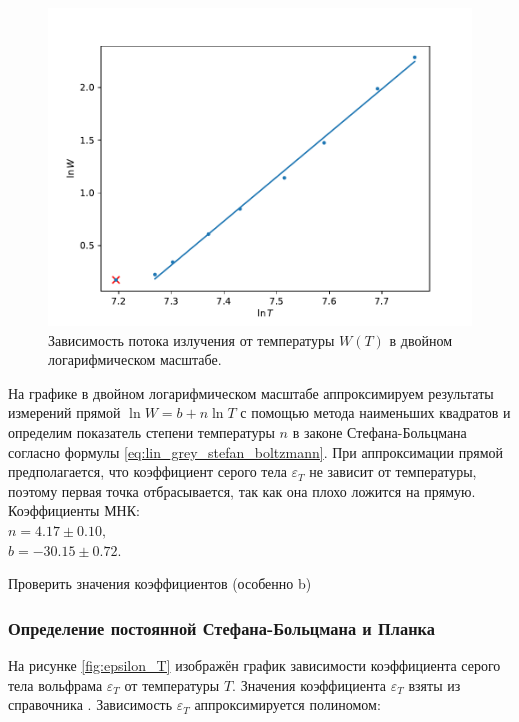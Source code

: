 \documentclass[10pt,a4paper]{article}
\begin{document}
\begin{multicols}{2}
	\begin{figure}[H]
		\includegraphics[width=1\textwidth]{gen/fig-linwt.pdf}
		\caption{Зависимость потока излучения от температуры $W(T)$ в двойном логарифмическом масштабе.}
		\label{fig:lnw_lnt}
	\end{figure}
	
	На графике в двойном логарифмическом масштабе аппроксимируем результаты измерений прямой $\ln W = b + n \ln T$ с помощью метода наименьших квадратов и определим показатель степени температуры $n$ в законе Стефана-Больцмана согласно формулы \ref{eq:lin_grey_stefan_boltzmann}. При аппроксимации прямой предполагается, что коэффициент серого тела $\varepsilon_T$ не зависит от температуры, поэтому первая точка отбрасывается, так как она плохо ложится на прямую. Коэффициенты МНК: \\
	$n = 4.17 \pm 0.10,$ \\
	$b = -30.15 \pm 0.72.$
	
	\Huge 
	\color{red}
	Проверить значения коэффициентов (особенно b)
	\color{black}
	\normalsize	
	
	\subsubsection*{Определение постоянной Стефана-Больцмана и Планка}
	
	На рисунке \ref{fig:epsilon_T} изображён график зависимости коэффициента серого тела вольфрама $\varepsilon_T$ от температуры $T$. Значения коэффициента $\varepsilon_T$ взяты из справочника \cite[стр.~236]{labnik}. Зависимость $\varepsilon_T$ аппроксимируется полиномом:
	

\end{multicols}
\end{document}
